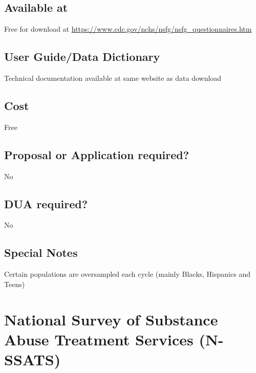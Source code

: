 \documentclass[
]{book}
\begin{document}
\hypertarget{available-at-62}{%
\section{Available at}\label{available-at-62}}

Free for download at \url{https://www.cdc.gov/nchs/nsfg/nsfg_questionnaires.htm}

\hypertarget{user-guidedata-dictionary-62}{%
\section{User Guide/Data Dictionary}\label{user-guidedata-dictionary-62}}

Technical documentation available at same website as data download

\hypertarget{cost-62}{%
\section{Cost}\label{cost-62}}

Free

\hypertarget{proposal-or-application-required-62}{%
\section{Proposal or Application required?}\label{proposal-or-application-required-62}}

No

\hypertarget{dua-required-62}{%
\section{DUA required?}\label{dua-required-62}}

No

\hypertarget{special-notes-62}{%
\section{Special Notes}\label{special-notes-62}}

Certain populations are oversampled each cycle (mainly Blacks, Hispanics and Teens)

\mainmatter

\hypertarget{national-survey-of-substance-abuse-treatment-services-n-ssats}{%
\chapter{National Survey of Substance Abuse Treatment Services (N-SSATS)}\label{national-survey-of-substance-abuse-treatment-services-n-ssats}}
\end{document}
